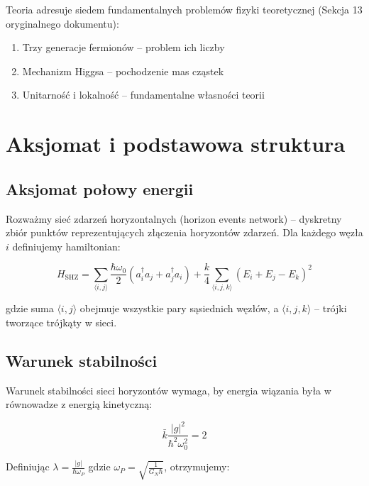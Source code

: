 \documentclass[11pt,a4paper]{article}
\begin{document}
Teoria adresuje siedem fundamentalnych problemów fizyki teoretycznej (Sekcja 13 oryginalnego dokumentu):

\begin{enumerate}
    \item[\textbf{A}] Trzy generacje fermionów -- problem ich liczby
    \item[\textbf{B}] Mechanizm Higgsa -- pochodzenie mas cząstek
    \item[\textbf{C}] Unitarność i lokalność -- fundamentalne własności teorii
\end{enumerate}

\bigskip

\section{Aksjomat i podstawowa struktura}

\subsection{Aksjomat połowy energii}

Rozważmy sieć zdarzeń horyzontalnych (horizon events network) -- dyskretny zbiór punktów reprezentujących złączenia horyzontów zdarzeń. Dla każdego węzła $i$ definiujemy hamiltonian:

\begin{equation}
H_{\text{SHZ}} = \sum_{\langle i,j \rangle} \frac{\hbar \omega_0}{2} \left( a_i^\dagger a_j + a_j^\dagger a_i \right) + \frac{k}{4} \sum_{\langle i,j,k \rangle} (E_i + E_j - E_k)^2
\end{equation}

gdzie suma $\langle i,j \rangle$ obejmuje wszystkie pary sąsiednich węzłów, a $\langle i,j,k \rangle$ -- trójki tworzące trójkąty w sieci.

\bigskip

\subsection{Warunek stabilności}

Warunek stabilności sieci horyzontów wymaga, by energia wiązania była w równowadze z energią kinetyczną:

\begin{equation}
\bar{k} \frac{|g|^2}{\hbar^2 \omega_0^2} = 2
\end{equation}

Definiując $\lambda = \frac{|g|}{\hbar \omega_P}$ gdzie $\omega_P = \sqrt{\frac{1}{G_N \hbar}}$, otrzymujemy:
\end{document}

